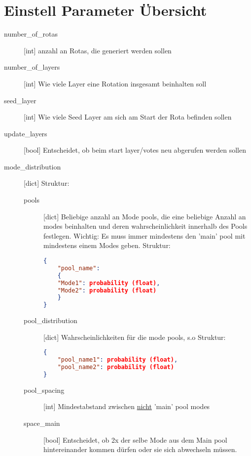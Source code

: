 \section{Einstell Parameter Übersicht}
\begin{description}
    \item[number\_of\_rotas][int] \newline
        anzahl an Rotas, die generiert werden sollen
    \item[number\_of\_layers][int] \newline
        Wie viele Layer eine Rotation insgesamt beinhalten soll
    \item[seed\_layer][int] \newline
        Wie viele Seed Layer am sich am Start der Rota befinden sollen
    \item[update\_layers][bool] \newline
        Entscheidet, ob beim start layer/votes neu abgerufen werden sollen
    \item[mode\_distribution][dict] \newline
    Struktur: 
    \begin{description}
        \item[pools][dict] \newline
        Beliebige anzahl an Mode pools, die eine beliebige Anzahl an modes beinhalten und deren wahrscheinlichkeit innerhalb des Pools festlegen.
        Wichtig: Es muss immer mindestens den 'main' pool mit mindestens einem Modes geben.
        Struktur:
\begin{lstlisting}[language=json, firstnumber=1]
{
    "pool_name": 
    {
    "Mode1": probability (float),
    "Mode2": probability (float)
    }
}
\end{lstlisting}
        \item[pool\_distribution][dict] \newline
        Wahrscheinlichkeiten für die mode pools, s.o
        Struktur:
\begin{lstlisting}[language=json, firstnumber=1]
{
    "pool_name1": probability (float),
    "pool_name2": probability (float)
}
\end{lstlisting}
    \item[pool\_spacing][int] \newline
    Mindestabstand zwischen \underline{nicht} 'main' pool modes
    \item[space\_main][bool] \newline
    Entscheidet, ob 2x der selbe Mode aus dem Main pool hintereinander kommen dürfen oder sie sich abwechseln müssen.
    \end{description}
\end{description}
